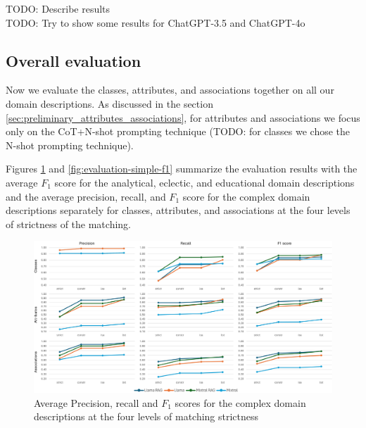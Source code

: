 \noindent{}TODO: Describe results \\

\noindent{}TODO: Try to show some results for ChatGPT-3.5 and ChatGPT-4o \\



\subsection{Overall evaluation}
\label{sec:overall_evaluation}

Now we evaluate the classes, attributes, and associations together on all our domain descriptions. As discussed in the section \ref{sec:preliminary_attributes_associations}, for attributes and associations we focus only on the CoT+N-shot prompting technique (TODO: for classes we chose the N-shot prompting technique).

Figures \ref{fig:evaluation-complex-p-r-f1} and \ref{fig:evaluation-simple-f1} summarize the evaluation results with the average $F_1$ score for the analytical, eclectic, and educational domain descriptions and the average precision, recall, and $F_1$ score for the complex domain descriptions separately for classes, attributes, and associations at the four levels of strictness of the matching.

\begin{figure}[!h]
    \centering
    \includegraphics[scale=0.10]{img/evaluation-complex-p-r-f1.png}
    \caption{\centering Average Precision, recall and $F_1$ scores for the complex domain descriptions at the four levels of matching strictness}
    \label{fig:evaluation-complex-p-r-f1}
\end{figure}

